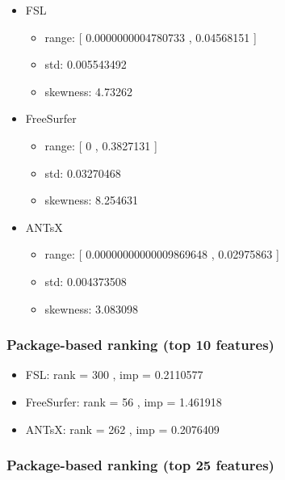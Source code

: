 \documentclass[
  10pt,
]{article}
\begin{document}
\begin{itemize}
\item
  FSL

  \begin{itemize}
  \item
    range: {[} 0.0000000004780733 , 0.04568151 {]}
  \item
    std: 0.005543492
  \item
    skewness: 4.73262
  \end{itemize}
\item
  FreeSurfer

  \begin{itemize}
  \item
    range: {[} 0 , 0.3827131 {]}
  \item
    std: 0.03270468
  \item
    skewness: 8.254631
  \end{itemize}
\item
  ANTsX

  \begin{itemize}
  \item
    range: {[} 0.00000000000009869648 , 0.02975863 {]}
  \item
    std: 0.004373508
  \item
    skewness: 3.083098
  \end{itemize}
\end{itemize}

\hypertarget{package-based-ranking-top-10-features-10}{%
\subsubsection{Package-based ranking (top 10
features)}\label{package-based-ranking-top-10-features-10}}

\begin{itemize}
\item
  FSL: rank = 300 , imp = 0.2110577
\item
  FreeSurfer: rank = 56 , imp = 1.461918
\item
  ANTsX: rank = 262 , imp = 0.2076409
\end{itemize}

\hypertarget{package-based-ranking-top-25-features-10}{%
\subsubsection{Package-based ranking (top 25
features)}\label{package-based-ranking-top-25-features-10}}
\end{document}

